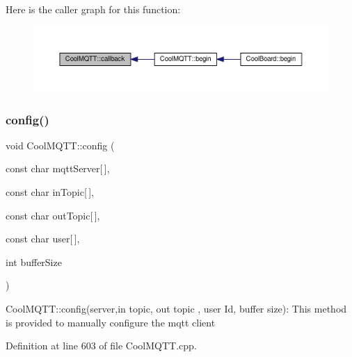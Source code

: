 Here is the caller graph for this function\+:\nopagebreak
\begin{figure}[H]
\begin{center}
\leavevmode
\includegraphics[width=350pt]{d0/dd0/class_cool_m_q_t_t_a30d82ad665bfb603f46ecdbc290775df_icgraph}
\end{center}
\end{figure}
\mbox{\label{class_cool_m_q_t_t_a9b703de4f1358f0ee7a5e8c44979c648}} 
\subsubsection{\texorpdfstring{config()}{config()}\hspace{0.1cm}{\footnotesize\ttfamily [1/2]}}
{\footnotesize\ttfamily void Cool\+M\+Q\+T\+T\+::config (\begin{DoxyParamCaption}\item[{const char}]{mqtt\+Server\mbox{[}$\,$\mbox{]},  }\item[{const char}]{in\+Topic\mbox{[}$\,$\mbox{]},  }\item[{const char}]{out\+Topic\mbox{[}$\,$\mbox{]},  }\item[{const char}]{user\mbox{[}$\,$\mbox{]},  }\item[{int}]{buffer\+Size }\end{DoxyParamCaption})}

Cool\+M\+Q\+T\+T\+::config(server,in topic, out topic , user Id, buffer size)\+: This method is provided to manually configure the mqtt client 

Definition at line 603 of file Cool\+M\+Q\+T\+T.\+cpp.



